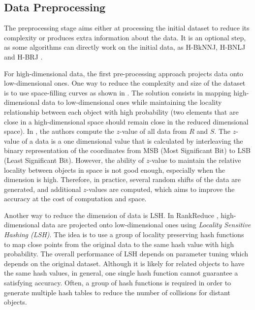 \subsection{Data Preprocessing}\label{data_preprocessing}
The preprocessing stage aims either at processing the initial dataset to reduce its complexity or produces extra information
about the data. It is an optional step, as some algorithms can directly work on the initial data, as H-BkNNJ, H-BNLJ and 
H-BRJ \cite{Zhang:2012:EPK:2247596.2247602}.
\vspace{2pt}

For high-dimensional data, the first pre-processing approach projects data onto low-dimensional ones. One way to reduce the complexity and size of the dataset is to use space-filling curves as shown in \cite{5447837}. The solution consists in mapping
high-dimensional data to low-dimensional ones while maintaining the locality relationship between each object with high 
probability (two elements that are close in a high-dimensional space should remain close in the reduced dimensional space). In \cite{Zhang:2012:EPK:2247596.2247602}, the authors compute the $z$-value of all data from $R$ and $S$. The $z$-value of a 
data is a one dimensional value that is  
calculated by interleaving the binary representation of the coordinates from MSB (Most Significant Bit) to LSB (Least 
Significant Bit). However, the ability of $z$-value to 
maintain the relative locality between objects in space is not good enough, especially when the dimension is high. Therefore, 
in practice, several random shifts of 
the data are generated, and additional $z$-values are computed, which aims to improve the accuracy at the cost of computation and space. 

Another way to reduce the dimension of data is LSH. In RankReduce \cite{Stupar10rankreduce-}, high-dimensional data are projected onto low-dimensional ones using 
\emph{Locality Sensitive Hashing (LSH)}. The idea is to use a group of locality preserving hash functions to map close points 
from the original data to the same hash value with high probability. The overall performance of LSH depends on parameter 
tuning \cite{Bawa:2005:LFS:1060745.1060840} which depends on the original dataset. Although it is likely for related objects 
to have
the same hash values, in general, one single
hash function cannot guarantee a satisfying accuracy. Often,
a group of hash functions is required in order to generate multiple hash tables
to reduce the number of collisions for distant objects.

